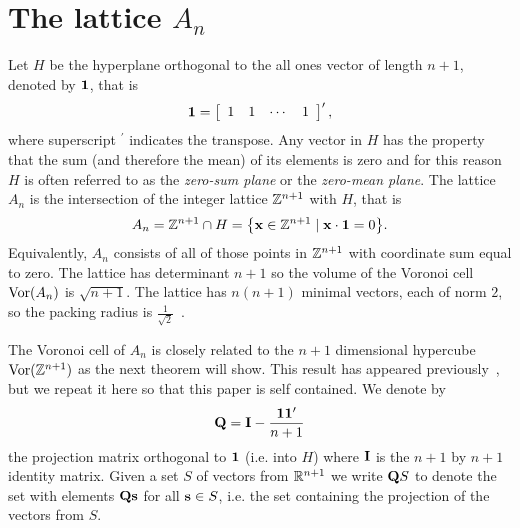 \documentclass[draftcls, onecolumn, 11pt]{IEEEtran}
\begin{document}
\section{The lattice $A_n$}\label{sec:lattice-a_n}
Let $H$ be the hyperplane orthogonal to the all ones vector of length $n+1$, denoted by $\boldsymbol{1}$, that is
\[
\boldsymbol{1} = \left[ \begin{array}{cccc} 1 & 1 & \cdots & 1 \end{array} \right]^\prime,
\]
where superscript $^\prime$ indicates the transpose.  Any vector in $H$ has the property that the sum (and therefore the mean) of its elements is zero and for this reason $H$ is often referred to as the \emph{zero-sum plane} or the \emph{zero-mean plane}.  
The lattice $A_n$ is the intersection of the integer lattice ${\mathbb Z}^{n+1}$ with $H$, that is
\begin{equation} 
\label{eq:An_sub_Zn}
  A_{n} = \ints^{n+1} \cap H = \big\{ \xbf \in \ints^{n+1} \mid \xbf\cdot\onebf = 0  \big\}.
\end{equation}
Equivalently, $A_n$ consists of all of those points in ${\mathbb Z}^{n+1}$ with coordinate sum equal to zero.
The lattice has determinant $n+1$ so the volume of the Voronoi cell $\operatorname{Vor}(A_n)$ is $\sqrt{n+1}$.  The lattice has $n(n+1)$ minimal vectors, each of norm $2$, so the packing radius is $\frac{1}{\sqrt{2}}$~\cite[p. 108]{SPLAG}.

The Voronoi cell of $A_n$ is closely related to the $n+1$ dimensional hypercube $\operatorname{Vor}({\mathbb Z}^{n+1})$ as the next theorem will show.  This result has appeared previously~\cite{McKilliam2009CoxeterLattices,McKilliam2010thesis}, but we repeat it here so that this paper is self contained.  We denote by 
\[
\mathbf{Q} = \mathbf{I} - \frac{\boldsymbol{1}\boldsymbol{1}^\prime}{n+1}
\]
the projection matrix orthogonal to $\boldsymbol{1}$ (i.e. into $H$) where $\mathbf{I}$ is the $n+1$ by $n+1$ identity matrix.  Given a set $S$ of vectors from ${\mathbb R}^{n+1}$ we write $\mathbf{Q} S$  to denote the set with elements $\mathbf{Q} \mathbf{s}$ for all $\mathbf{s} \in S$, i.e. the set containing the projection of the vectors from $S$.
  
\end{document}

